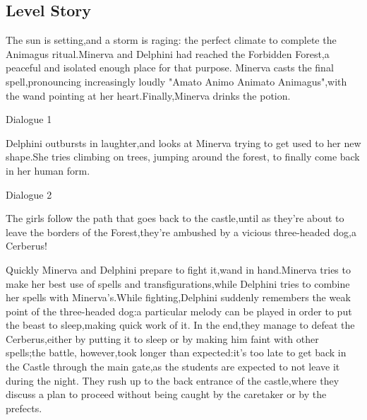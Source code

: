 \subsection{Level Story}

The sun is setting,and a storm is raging: the perfect climate to complete the Animagus ritual.Minerva and Delphini had reached the Forbidden Forest,a peaceful and isolated enough place for that purpose. Minerva casts the final spell,pronouncing increasingly loudly "Amato Animo Animato Animagus",with the wand pointing at her heart.Finally,Minerva drinks the potion.


\begin{dialogue}{Dialogue 1}
\end{dialogue} 

Delphini outbursts in laughter,and looks at Minerva trying to get used to her new shape.She tries climbing on trees, jumping around the forest, to finally come back in her human form.

\pagebreak

\begin{dialogue}{Dialogue 2}
\end{dialogue} 

The girls follow the path that goes back to the castle,until as they're about to leave the borders of the Forest,they're ambushed by a vicious three-headed dog,a Cerberus!


Quickly Minerva and Delphini prepare to fight it,wand in hand.Minerva tries to make her best use of spells and transfigurations,while Delphini tries to combine her spells with Minerva's.While fighting,Delphini suddenly remembers the weak point of the three-headed dog:a particular melody can be played in order to put the beast to sleep,making quick work of it. In the end,they manage to defeat the Cerberus,either by putting it to sleep or by making him faint with other spells;the battle, however,took longer than expected:it's too late to get back in the Castle through the main gate,as the students are expected to not leave it during the night. They rush up to the back entrance of the castle,where they discuss a plan to proceed without being caught by the caretaker or by the prefects.
  
